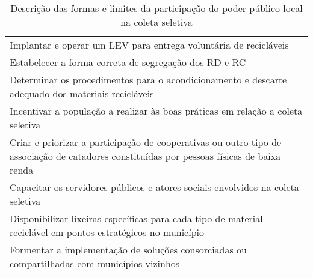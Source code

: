 \begin{table}[htbp]
  \centering
  \caption{Descrição das formas e limites da participação do poder público local na coleta seletiva}
    \begin{tabular}{P{40.855em}}
     Implantar e operar um LEV para entrega voluntária de recicláveis \\
     Estabelecer a forma correta de segregação dos RD e RC \\
     Determinar os procedimentos para o acondicionamento e descarte adequado dos materiais recicláveis \\
     Incentivar a população a realizar às boas práticas em relação a coleta seletiva \\
     Criar e priorizar a participação de cooperativas ou outro tipo de associação de catadores constituídas por pessoas físicas de baixa renda \\
     Capacitar os servidores públicos e atores sociais envolvidos na coleta seletiva \\
     Disponibilizar lixeiras específicas para cada tipo de material reciclável em pontos estratégicos no município \\
     Formentar a implementação de soluções consorciadas ou compartilhadas com municípios vizinhos \\
    \end{tabular}%
  \label{tab:limites_coleta_seletiva}%
\end{table}%
